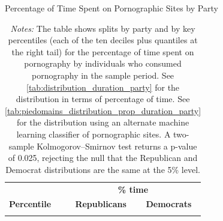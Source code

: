 \documentclass[12pt, letterpaper]{article}
\begin{document}
\begin{table}[ht] \centering \small \setlength\tabcolsep{10 pt}
	\caption{Percentage of Time Spent on Pornographic Sites by Party}
	\label{tab:distribution_prop_duration_party}
	\begin{adjustbox}{max width=\textwidth}
		\begin{tabular}{crr}
			\toprule
			\multicolumn{1}{l}{\textbf{}}&\multicolumn{2}{c}{\textbf{\% time}}\\
			\cmidrule(l){2-3}
			\multicolumn{1}{l}{\textbf{Percentile}}&\multicolumn{1}{c}{\textbf{Republicans}}&\multicolumn{1}{c}{\textbf{Democrats}}\\
			\midrule
			\\
			\bottomrule
		\end{tabular}
	\end{adjustbox}
	\caption*{\footnotesize \emph{Notes:} 
		The table shows splits by party and by key percentiles (each of the ten deciles plus quantiles at the right tail) for the percentage of time spent on pornography by individuals who consumed pornography in the sample period. 
		See \cref{tab:distribution_duration_party} for the distribution in terms of percentage of time.
		See \cref{tab:piedomains_distribution_prop_duration_party} for the distribution using an alternate machine learning classifier of pornographic sites. 
		A two-sample Kolmogorov–Smirnov test returns a p-value of 0.025, rejecting the null that the Republican and Democrat distributions are the same at the 5\% level.
	}
\end{table}

\FloatBarrier
\clearpage
\end{document}
